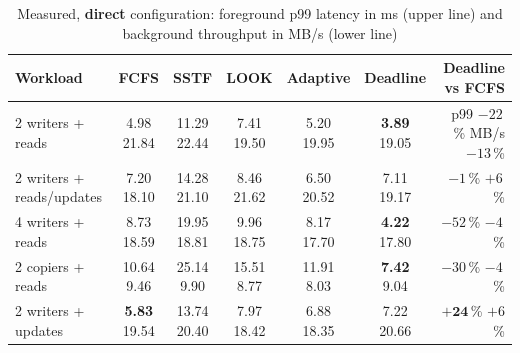 \documentclass[12pt,a4paper]{article}
\renewcommand{\arraystretch}{1.18}
\begin{document}
\begin{table}[!htbp]
\centering
\caption[Measured p99 and throughput, direct configuration]{Measured, \textbf{direct} configuration: foreground p99 latency in ms (upper line) and background throughput in MB/s (lower line)}
\label{tab:direct}
\footnotesize
\setlength{\tabcolsep}{3.5pt}
\renewcommand{\arraystretch}{1.45}
\begin{tabular}{@{}l c c c c c r@{}}
\toprule
\textbf{Workload} & \textbf{FCFS} & \textbf{SSTF} & \textbf{LOOK} & \textbf{Adaptive} & \textbf{Deadline} & \makecell[r]{\textbf{Deadline}\\\textbf{vs FCFS}} \\
\midrule
2 writers + reads & \makecell{4.98\\21.84} & \makecell{11.29\\22.44} & \makecell{7.41\\19.50} & \makecell{5.20\\19.95} & \makecell{\textbf{3.89}\\19.05} & \makecell[r]{p99 $-22$\,\%\\MB/s $-13$\,\%} \\
2 writers + reads/updates & \makecell{7.20\\18.10} & \makecell{14.28\\21.10} & \makecell{8.46\\21.62} & \makecell{6.50\\20.52} & \makecell{7.11\\19.17} & \makecell[r]{$-1$\,\%\\$+6$\,\%} \\
4 writers + reads & \makecell{8.73\\18.59} & \makecell{19.95\\18.81} & \makecell{9.96\\18.75} & \makecell{8.17\\17.70} & \makecell{\textbf{4.22}\\17.80} & \makecell[r]{$-52$\,\%\\$-4$\,\%} \\
2 copiers + reads & \makecell{10.64\\9.46} & \makecell{25.14\\9.90} & \makecell{15.51\\8.77} & \makecell{11.91\\8.03} & \makecell{\textbf{7.42}\\9.04} & \makecell[r]{$-30$\,\%\\$-4$\,\%} \\
2 writers + updates & \makecell{\textbf{5.83}\\19.54} & \makecell{13.74\\20.40} & \makecell{7.97\\18.42} & \makecell{6.88\\18.35} & \makecell{7.22\\20.66} & \makecell[r]{$\mathbf{+24}$\,\%\\$+6$\,\%} \\

\end{tabular}
\end{table}
\end{document}
